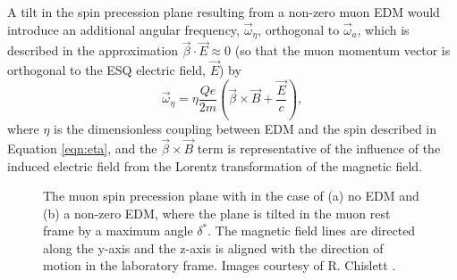 A tilt in the spin precession plane resulting from a non-zero muon EDM would introduce an additional angular frequency, $\vec{\omega}_{\eta}$, orthogonal to $\vec{\omega}_{a}$, which is described in the approximation $\vec{\beta}\cdot\vec{E}\approx0$ (so that the muon momentum vector is orthogonal to the ESQ electric field, $\vec{E}$) by 
%
\begin{equation} 
  \vec{\omega}_{\eta} = \eta\frac{Qe}{2m}\left(\vec{\beta}\times\vec{B}+\frac{\vec{E}}{c}\right),
  \label{eqn:omega_eta}
\end{equation}
%
where $\eta$ is the dimensionless coupling between EDM and the spin described in Equation \ref{eqn:eta}, and the $\vec{\beta}\times\vec{B}$ term is representative of the influence of the induced electric field from the Lorentz transformation of the magnetic field. 
\begin{figure}[t!]
\centering{}
 \hfill
{}
\caption{The muon spin precession plane with in the case of (a) no EDM and (b) a non-zero EDM, where the plane is tilted in the muon rest frame by a maximum angle $\delta^{*}$. The magnetic field lines are directed along the y-axis and the z-axis is aligned with the direction of motion in the laboratory frame. Images courtesy of R. Chislett \cite{BeckyGeometry}.}
\label{fig:Tilt1}
\end{figure}

